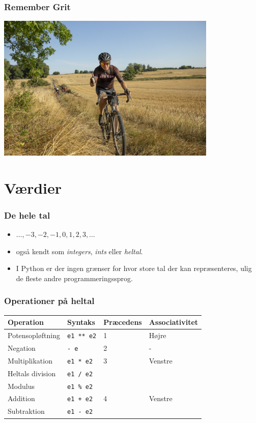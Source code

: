 \documentclass[10pt]{beamer}
\begin{document}
\begin{frame}
   \frametitle{Remember Grit}
   \includegraphics[height=7cm]{images/grit}
\end{frame}

\section{Værdier}
\begin{frame}
  \frametitle{De hele tal}

  \begin{itemize}
  \item $\ldots, -3, -2, -1, 0, 1, 2, 3, \ldots$
  \item også kendt som \textit{integers}, \textit{ints} eller \textit{heltal}.
  \item I Python er der ingen grænser for hvor store tal der kan
    repræsenteres, ulig de fleste andre programmeringssprog.
  \end{itemize}
  
\end{frame}


\begin{frame}
  \frametitle{Operationer på heltal}
  \begin{tabular}{llll}
    \toprule
    \textbf{Operation} & \textbf{Syntaks} & \textbf{Præcedens} & \textbf{Associativitet} \\
    \toprule
    Potensopløftning & \texttt{e1 ** e2} & 1 & Højre \\ \midrule
    Negation & \texttt{- e} & 2 & - \\
    \midrule
    Multiplikation & \texttt{e1 * e2} & 3 & Venstre\\
    Heltals division & \texttt{e1 / e2} & &\\
    Modulus & \texttt{e1 \% e2} & &\\
    \midrule
    Addition & \texttt{e1 + e2} & 4 & Venstre\\
    Subtraktion & \texttt{e1 - e2} & & \\
    \bottomrule
  \end{tabular}

\end{frame}
\end{document}
